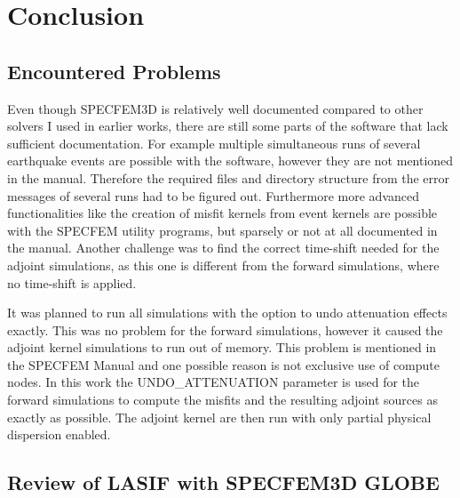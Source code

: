 

\chapter{Conclusion}


\section{Encountered Problems}

Even though SPECFEM3D is relatively well documented compared to other solvers I used in 
earlier works, there are still some parts of the software that lack sufficient documentation.
For example multiple simultaneous runs of several earthquake events are possible with the 
software, however they are not mentioned in the manual.
Therefore the required files and directory structure from the error messages of
several runs had to be figured out. 
Furthermore more advanced functionalities like the creation of misfit kernels from event kernels are
possible with the SPECFEM utility programs, but sparsely or not at all documented in the manual.
Another challenge was to find the correct time-shift needed for the adjoint simulations, as this 
one is different from the forward simulations, where no time-shift is applied.

It was planned to run all simulations with the option to undo attenuation effects exactly. 
This was no problem for the forward simulations, however it caused the adjoint kernel
simulations to run out of memory.
This problem is mentioned in the SPECFEM Manual and one possible reason is not exclusive use
of compute nodes. 
In this work the UNDO\_ATTENUATION parameter is used for the forward simulations to compute the 
misfits and the resulting adjoint sources as exactly as possible.
The adjoint kernel are then run with only partial physical dispersion enabled.

\section{Review of LASIF with SPECFEM3D GLOBE} 

